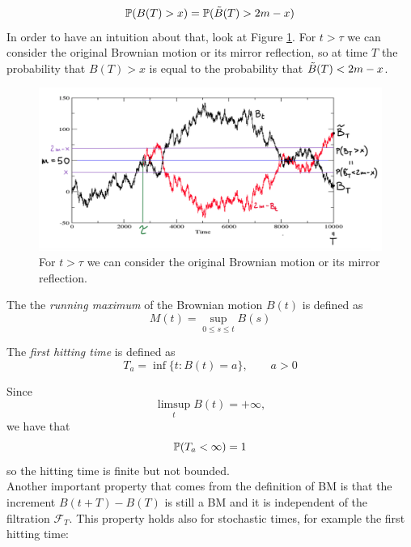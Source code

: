 \begin{equation}
    \mathbb{P}(B(T)>x) = \mathbb{P}(\Tilde{B}(T)>2m-x)
\end{equation}
In order to have an intuition about that, look at Figure \ref{fig:bmmirror}. For $t>\tau$ we can consider the original Brownian motion or its mirror reflection, so at time $T$ the probability that $B(T)>x$ is equal to the probability that $\Tilde{B}(T)<2m-x$.
\begin{figure}[h]
    \centering
    \includegraphics[scale=0.22]{fig/tmp/fig34.png}
    \caption{For $t>\tau$ we can consider the original Brownian motion or its mirror reflection.}
    \label{fig:bmmirror}
\end{figure}
\begin{definition}
    The the \emph{running maximum} of the Brownian motion $B(t)$ is defined as
    \begin{equation}
        M(t) = \sup_{0\le s\le t} B(s)
    \end{equation}
\end{definition}
\begin{definition}
    The \emph{first hitting time} is defined as
    \begin{equation}
        T_a = \inf\{t:B(t)=a\}, \qquad a>0 
    \end{equation}
\end{definition}
Since
\begin{equation*}
    \limsup_t B(t) = +\infty,
\end{equation*}
we have that 
\begin{equation}
    \mathbb{P}(T_a<\infty) = 1
\end{equation}
so the hitting time is finite but not bounded. \\
Another important property that comes from the definition of BM is that the increment $B(t+T)-B(T)$ is still a BM and it is independent of the filtration $\mathcal{F}_T$. This property holds also for stochastic times, for example the first hitting time:

